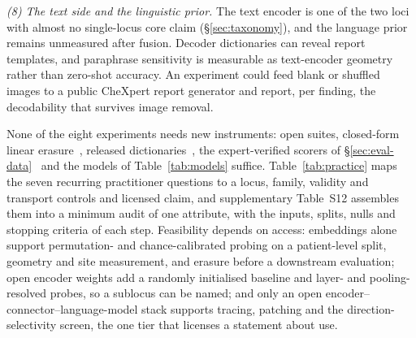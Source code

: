 \textit{(8) The text side and the linguistic prior.} The text encoder is one of the two loci with almost no
single-locus core claim (\S\ref{sec:taxonomy}), and the language prior remains unmeasured after fusion. Decoder
dictionaries can reveal report templates, and paraphrase sensitivity is measurable as text-encoder geometry
rather than zero-shot accuracy. An experiment could feed blank or shuffled images to a public CheXpert report
generator and report, per finding, the decodability that survives image removal.

None of the eight experiments needs new instruments: open suites, closed-form linear
erasure~\cite{belrose2023leace}, released dictionaries~\cite{abdulaal2024an,nooralahzadeh2026universal},
the expert-verified scorers of \S\ref{sec:eval-data}~\cite{kim2024transparent} and the models of
Table~\ref{tab:models} suffice. Table~\ref{tab:practice} maps the seven recurring practitioner questions to
a locus, family, validity and transport controls and licensed claim, and supplementary Table~S12 assembles
them into a minimum audit of one attribute, with the inputs, splits, nulls and stopping criteria of each
step. Feasibility depends on access: embeddings alone support permutation- and chance-calibrated probing on a
patient-level split, geometry and site measurement, and erasure before a downstream evaluation; open
encoder weights add a randomly initialised baseline and layer- and pooling-resolved probes, so a sublocus
can be named; and only an open encoder--connector--language-model stack supports tracing, patching and the
direction-selectivity screen, the one tier that licenses a statement about use.
